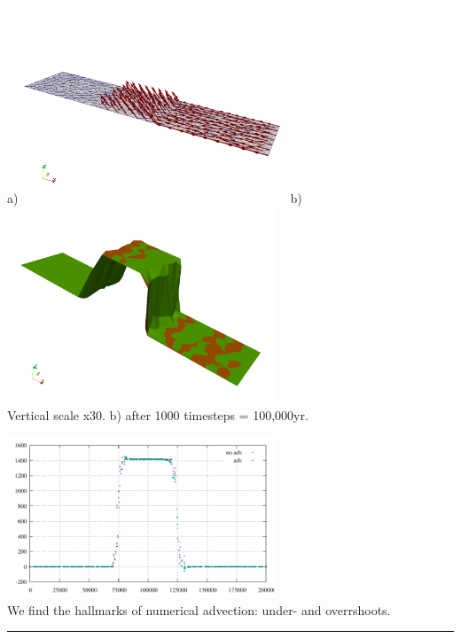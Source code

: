 \begin{center}
a)\includegraphics[width=8cm]{python_codes/fieldstone_140/results/exp6/uplift}
b)\includegraphics[width=8cm]{python_codes/fieldstone_140/results/exp6/elevation.png}\\
{\captionfont Vertical scale x30. b) after 1000 timesteps = 100,000yr.}
\end{center}

\begin{center}
\includegraphics[width=8cm]{python_codes/fieldstone_140/results/exp6/elevation.pdf}\\
{\captionfont We find the hallmarks of numerical advection: under- and overrshoots.}
\end{center}



\par\noindent\rule{\textwidth}{0.4pt}


